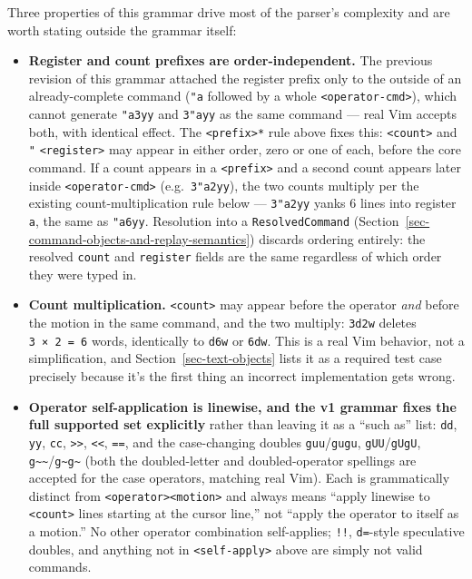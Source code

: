 \documentclass[11pt]{article}
\providecommand{\tightlist}{%
  \setlength{\itemsep}{0pt}\setlength{\parskip}{0pt}}
\begin{document}
Three properties of this grammar drive most of the parser's complexity and
are worth stating outside the grammar itself:

\begin{itemize}
\tightlist
\item
  \textbf{Register and count prefixes are order-independent.} The previous
  revision of this grammar attached the register prefix only to the
  outside of an already-complete command (\texttt{"a} followed by a whole
  \texttt{\textless{}operator-cmd\textgreater{}}), which cannot generate \texttt{"a3yy} and \texttt{3"ayy} as the same
  command --- real Vim accepts both, with identical effect. The
  \texttt{\textless{}prefix\textgreater{}*} rule above fixes this: \texttt{\textless{}count\textgreater{}} and \texttt{"} \texttt{\textless{}register\textgreater{}} may
  appear in either order, zero or one of each, before the core command.
  If a count appears in a \texttt{\textless{}prefix\textgreater{}} and a second count appears later
  inside \texttt{\textless{}operator-cmd\textgreater{}} (e.g.~\texttt{3"a2yy}), the two counts multiply per the
  existing count-multiplication rule below --- \texttt{3"a2yy} yanks 6 lines into
  register \texttt{a}, the same as \texttt{"a6yy}. Resolution into a \texttt{ResolvedCommand}
  (Section~\ref{sec-command-objects-and-replay-semantics}) discards ordering entirely: the resolved \texttt{count} and
  \texttt{register} fields are the same regardless of which order they were
  typed in.
\item
  \textbf{Count multiplication.} \texttt{\textless{}count\textgreater{}} may appear before the operator \emph{and}
  before the motion in the same command, and the two multiply:
  \texttt{3d2w} deletes \texttt{3\ ×\ 2\ =\ 6} words, identically to \texttt{d6w} or \texttt{6dw}. This is a
  real Vim behavior, not a simplification, and Section~\ref{sec-text-objects} lists it as a
  required test case precisely because it's the first thing an incorrect
  implementation gets wrong.
\item
  \textbf{Operator self-application is linewise, and the v1 grammar fixes the
  full supported set explicitly} rather than leaving it as a ``such as''
  list: \texttt{dd}, \texttt{yy}, \texttt{cc}, \texttt{\textgreater{}\textgreater{}}, \texttt{\textless{}\textless{}}, \texttt{==}, and the case-changing doubles
  \texttt{guu}/\texttt{gugu}, \texttt{gUU}/\texttt{gUgU}, \texttt{g\textasciitilde{}\textasciitilde{}}/\texttt{g\textasciitilde{}g\textasciitilde{}} (both the doubled-letter and
  doubled-operator spellings are accepted for the case operators, matching
  real Vim). Each is grammatically distinct from \texttt{\textless{}operator\textgreater{}\textless{}motion\textgreater{}} and
  always means ``apply linewise to \texttt{\textless{}count\textgreater{}} lines starting at the cursor
  line,'' not ``apply the operator to itself as a motion.'' No other operator
  combination self-applies; \texttt{!!}, \texttt{d=}-style speculative doubles, and
  anything not in \texttt{\textless{}self-apply\textgreater{}} above are simply not valid commands.
\end{itemize}
\end{document}
